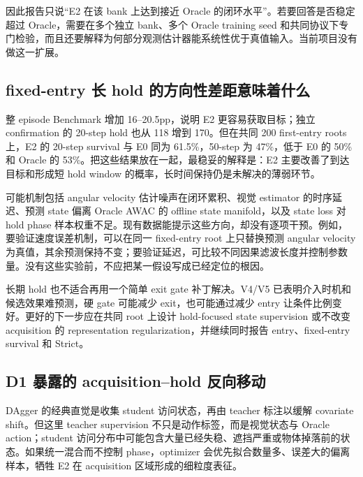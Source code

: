 因此报告只说``E2 在该 bank 上达到接近 Oracle 的闭环水平''。若要回答是否稳定超过 Oracle，需要在多个独立 bank、多个 Oracle training seed 和共同协议下专门检验，而且还要解释为何部分观测估计器能系统性优于真值输入。当前项目没有做这一扩展。

\hypertarget{fixed-entry-ux957f-hold-ux7684ux65b9ux5411ux6027ux5deeux8dddux610fux5473ux7740ux4ec0ux4e48}{%
\subsection{fixed-entry 长 hold 的方向性差距意味着什么}\label{fixed-entry-ux957f-hold-ux7684ux65b9ux5411ux6027ux5deeux8dddux610fux5473ux7740ux4ec0ux4e48}}

整 episode Benchmark 增加 16--20.5pp，说明 E2 更容易获取目标；独立 confirmation 的 20-step hold 也从 118 增到 170。但在共同 200 first-entry roots 上，E2 的 20-step survival 与 E0 同为 61.5\%，50-step 为 47\%，低于 E0 的 50\% 和 Oracle 的 53\%。把这些结果放在一起，最稳妥的解释是：E2 主要改善了到达目标和形成短 hold window 的概率，长时间保持仍是未解决的薄弱环节。

可能机制包括 angular velocity 估计噪声在闭环累积、视觉 estimator 的时序延迟、预测 state 偏离 Oracle AWAC 的 offline state manifold，以及 state loss 对 hold phase 样本权重不足。现有数据能提示这些方向，却没有逐项干预。例如，要验证速度误差机制，可以在同一 fixed-entry root 上只替换预测 angular velocity 为真值，其余预测保持不变；要验证延迟，可比较不同因果滤波长度并控制参数量。没有这些实验前，不应把某一假设写成已经定位的根因。

长期 hold 也不适合再用一个简单 exit gate 补丁解决。V4/V5 已表明介入时机和候选效果难预测，硬 gate 可能减少 exit，也可能通过减少 entry 让条件比例变好。更好的下一步应在共同 root 上设计 hold-focused state supervision 或不改变 acquisition 的 representation regularization，并继续同时报告 entry、fixed-entry survival 和 Strict。

\hypertarget{d1-ux66b4ux9732ux7684-acquisitionhold-ux53cdux5411ux79fbux52a8}{%
\subsection{D1 暴露的 acquisition--hold 反向移动}\label{d1-ux66b4ux9732ux7684-acquisitionhold-ux53cdux5411ux79fbux52a8}}

DAgger 的经典直觉是收集 student 访问状态，再由 teacher 标注以缓解 covariate shift。但这里 teacher supervision 不只是动作标签，而是视觉状态与 Oracle action；student 访问分布中可能包含大量已经失稳、遮挡严重或物体掉落前的状态。如果统一混合而不控制 phase，optimizer 会优先拟合数量多、误差大的偏离样本，牺牲 E2 在 acquisition 区域形成的细粒度表征。

